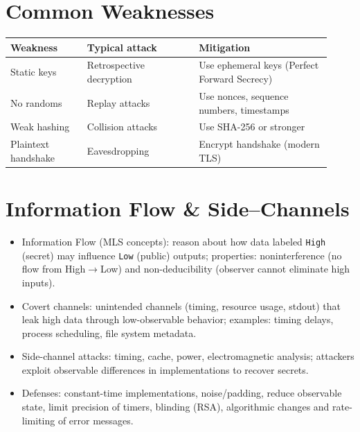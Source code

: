 \documentclass[12pt]{article}
\begin{document}
\hrulefill

\section{Common Weaknesses}
\begin{center}
\begin{tabular}{@{}p{0.22\linewidth}p{0.32\linewidth}p{0.38\linewidth}@{}}
\toprule
\textbf{Weakness} & \textbf{Typical attack} & \textbf{Mitigation} \\
\midrule
Static keys & Retrospective decryption & Use ephemeral keys (Perfect Forward Secrecy) \\
No randoms & Replay attacks & Use nonces, sequence numbers, timestamps \\
Weak hashing & Collision attacks & Use SHA-256 or stronger \\
Plaintext handshake & Eavesdropping & Encrypt handshake (modern TLS) \\
\bottomrule
\end{tabular}
\end{center}

\hrulefill

\section{Information Flow \& Side--Channels}
\begin{itemize}
  \item Information Flow (MLS concepts): reason about how data labeled \texttt{High} (secret) may influence \texttt{Low} (public) outputs; properties: noninterference (no flow from High$\to$Low) and non-deducibility (observer cannot eliminate high inputs).
  \item Covert channels: unintended channels (timing, resource usage, stdout) that leak high data through low-observable behavior; examples: timing delays, process scheduling, file system metadata.
  \item Side-channel attacks: timing, cache, power, electromagnetic analysis; attackers exploit observable differences in implementations to recover secrets.
  \item Defenses: constant-time implementations, noise/padding, reduce observable state, limit precision of timers, blinding (RSA), algorithmic changes and rate-limiting of error messages.
\end{itemize}
\end{document}
